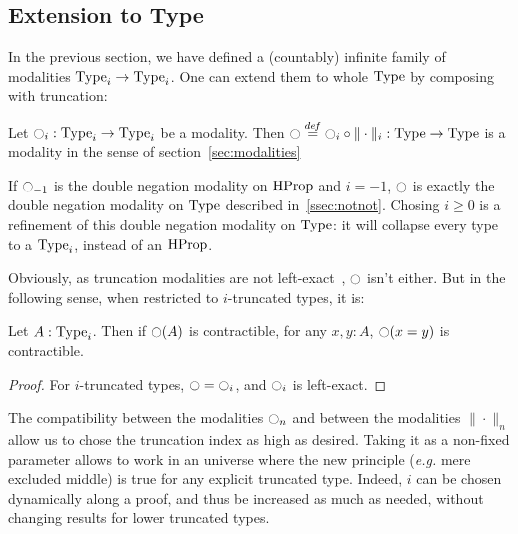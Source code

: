 

\subsection{Extension to Type}
\label{ssec:extension-type}

In the previous section, we have defined a (countably) infinite family of
modalities $\operatorname{Type}_i \to \operatorname{Type}_i$. One can extend them to whole
$\operatorname{Type}$ by composing with truncation:

\begin{lem}\label{lem:type}
  Let $\ocircle_i:\operatorname{Type}_i \to \operatorname{Type}_i$ be a modality. Then $\ocircle
  \overset{de\hspace{-0.2ex}f}{=} \ocircle_i
  \circ \|\cdot\|_i : \operatorname{Type} \to \operatorname{Type}$ is a modality in the sense
  of section~\ref{sec:modalities}
\end{lem}

If $\ocircle_{-1}$ is the double negation modality on $\operatorname{HProp}$ and
$i=-1$, $\ocircle$ is exactly the double negation modality on $\operatorname{Type}$
described in~\ref{ssec:notnot}.
Chosing $i\geqslant 0$ is a refinement of this double negation
modality on $\operatorname{Type}$: it will collapse every type to a $\operatorname{Type}_i$,
instead of an $\operatorname{HProp}$.

Obviously, as truncation modalities are not left-exact~\cite[Exercise
7.11]{hottbook}, $\ocircle$ isn't either. But in the following sense, when
restricted to $i$-truncated types, it is:
\begin{lem}
  Let $A:\operatorname{Type}_i$. Then if $\ocircle(A)$ is contractible, for any $x,y:A$,
  $\ocircle(x=y)$ is contractible.
\end{lem}
\begin{proof}
  For $i$-truncated types, $\ocircle = \ocircle_i$, and $\ocircle_i$ is left-exact.
\end{proof}

The compatibility between the modalities $\ocircle_n$ and between the
modalities $\|\cdot \|_n$ allow us to chose the truncation index as
high as desired.
Taking it as a non-fixed parameter allows to work in an
universe where the new principle ({\em e.g.} mere excluded middle) is
true for any explicit truncated type. Indeed, $i$ can be chosen
dynamically along a proof, and thus be increased as much as needed,
without changing results for lower truncated types.

